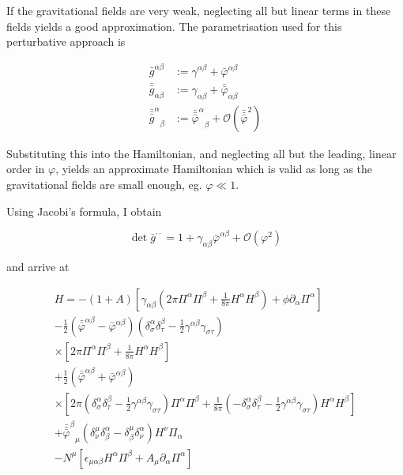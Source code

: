 \documentclass[11pt]{article}
\begin{document}
If the gravitational fields are very weak, neglecting all but linear terms in these fields yields a good approximation. The parametrisation used for this perturbative approach is

\begin{align}
	\bar{g}^{\alpha \beta} 
	&:= \gamma^{\alpha \beta} + \bar{\varphi}^{\alpha \beta}\\
	\bar{\bar{g}}_{\alpha \beta}
	&:= \gamma_{\alpha \beta} + \bar{\bar{\varphi}}_{\alpha \beta}\\
	{\bar{\bar{\bar{g}}}^\alpha}_\beta
	&:= {\bar{\bar{\bar{\varphi}}}^\alpha}_\beta
	+ \mathcal{O}\left(
	\bar{\bar{\bar{\varphi}}}^2 
	\right)
\end{align}

Substituting this into the Hamiltonian, and neglecting all but the leading, linear order in $\varphi$, yields an approximate Hamiltonian which is valid as long as the gravitational fields are small enough, eg. $\varphi \ll 1$.

Using Jacobi's formula, I obtain

\begin{equation}
	\det{\bar{g}^{\cdot \cdot}} 
	= 1 + \gamma_{\alpha \beta} \bar{\varphi}^{\alpha \beta}
	+ \mathcal{O} \left( \varphi^2 \right)
\end{equation}

and arrive at

\begin{equation} \label{geld_pert_ham}
	\begin{split}
		H = 
		- \left( 1 + A \right) 
		\left[
		\gamma_{\alpha \beta}
		\left( 
		2 \pi \Pi^\alpha \Pi^\beta
		+ \frac{1}{8 \pi} H^\alpha H^\beta 
		\right)
		+ \phi \partial_\alpha \Pi^\alpha
		\right] \\
		- \frac{1}{2} \left( 
		\bar{\bar{\varphi}}^{\alpha \beta} 
		- \bar{\varphi}^{\alpha \beta}
		\right)
		 \left( 
		 \delta^\alpha_\sigma \delta^\beta_\tau 
		- \frac{1}{2} \gamma^{\alpha \beta } \gamma_{\sigma \tau} 
		\right) \\
		\times \left[
		2 \pi 
		\Pi^\alpha \Pi^\beta
		+ \frac{1}{8 \pi} 
		H^\alpha H^\beta 
		\right] \\
		+ \frac{1}{2} \left( 
		\bar{\bar{\varphi}}^{\alpha \beta} 
		+ \bar{\varphi}^{\alpha \beta}
		\right) \\
		\times \left[
		2 \pi 
		\left( 
		\delta^\alpha_\sigma \delta^\beta_\tau 
		- \frac{1}{2} \gamma^{\alpha \beta } \gamma_{\sigma \tau} 
		\right)
		\Pi^\alpha \Pi^\beta
		+ \frac{1}{8 \pi} 
		 \left( 
		- \delta^\alpha_\sigma \delta^\beta_\tau 
		- \frac{1}{2} \gamma^{\alpha \beta } \gamma_{\sigma \tau} 
		\right)
		H^\alpha H^\beta 
		\right] \\
		+ {\bar{\bar{\bar{\varphi}}}^\beta}_\mu 
		\left(
		\delta^{\mu}_\nu \delta^\alpha_\beta 
		- \delta^{\mu}_\beta \delta^\alpha_\nu
		\right) H^\nu \Pi_\alpha \\
		- N^\mu
		\left[
		\epsilon_{\mu \alpha \beta} H^\alpha \Pi^\beta
		+ A_\mu \partial_\alpha \Pi^\alpha
		\right]
	\end{split}
\end{equation}
\end{document}
